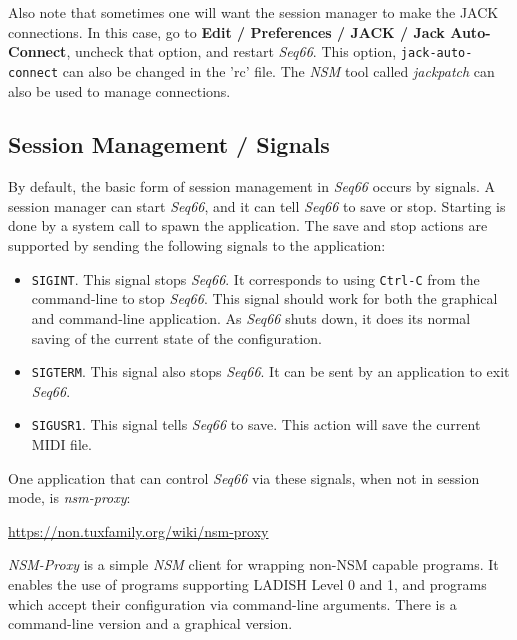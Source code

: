    Also note that sometimes one will want the session manager to make the JACK
   connections.  In this case, go to
   \textbf{Edit / Preferences / JACK / Jack Auto-Connect}, uncheck that option,
   and restart \textsl{Seq66}.
   This option, \texttt{jack-auto-connect}
   can also be changed in the 'rc' file.
   The \textsl{NSM} tool called \textsl{jackpatch} can also be used to manage
   connections.

\subsection{Session Management / Signals}
\label{subsec:sessions_signals}

   By default, the basic form of session management in
   \textsl{Seq66} occurs by signals.  A
   session manager can start \textsl{Seq66}, and it can tell \textsl{Seq66} to
   save or stop.  Starting is done by a system call to spawn the application.
   The save and stop actions are supported by sending the following signals to
   the application:

   \begin{itemize}
      \item \texttt{SIGINT}.
         This signal stops \textsl{Seq66}. It corresponds
         to using \texttt{Ctrl-C} from the command-line to stop \textsl{Seq66}.
         This signal should work for both the graphical and command-line
         application.  As \textsl{Seq66} shuts down, it does its normal saving
         of the current state of the configuration.
      \item \texttt{SIGTERM}.
         This signal also stops \textsl{Seq66}.  It can
         be sent by an application to exit \textsl{Seq66}.
      \item \texttt{SIGUSR1}.
         This signal tells \textsl{Seq66} to save.  This
         action will save the current MIDI file.
   \end{itemize}

   One application that can control \textsl{Seq66} via these signals, when not
   in session mode, is \textsl{nsm-proxy}:

      \url{https://non.tuxfamily.org/wiki/nsm-proxy}

   \textsl{NSM-Proxy} is a simple \textsl{NSM} client for wrapping non-NSM
   capable programs. It enables the use of programs supporting LADISH Level 0
   and 1, and programs which accept their configuration via command-line
   arguments.  There is a command-line version and a graphical version.

